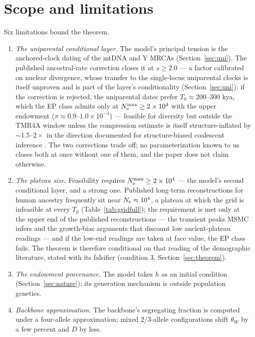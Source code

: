 \section{Scope and limitations}\label{sec:limits}
Six limitations bound the theorem.
\begin{enumerate}
\item \emph{The uniparental conditional layer.} The model's principal
tension is the anchored-clock dating of the mtDNA and Y MRCAs
(Section~\ref{sec:uni}). The published ancestral-rate correction
\citep{Scally2012} closes it at $s \ge 2.0$ --- a factor calibrated on
nuclear divergence, whose transfer to the single-locus uniparental clocks
is itself unproven and is part of the layer's conditionality
(Section~\ref{sec:uni}); if the correction is
rejected, the uniparental dates prefer $T_0 \approx 200$--$300$ kya,
which the EP class admits only at $N_{\mathrm{e}}^{\max} \ge 2\times10^{4}$ with the
upper endowment ($\pi \approx 0.9$--$1.0\times10^{-3}$) --- feasible for
diversity but outside the TMR4A window unless the compression estimate is
itself structure-inflated by $\sim$1.5--$2\times$ in the direction
documented for structure-biased coalescent inference
\citep{ErikssonManica2012,Scerri2019}. The two corrections trade off; no
parameterization known to us closes both at once without one of them,
and the paper does not claim otherwise.
\item \emph{The plateau size.} Feasibility requires
$N_{\mathrm{e}}^{\max} \ge 2\times10^{4}$ --- the model's second conditional layer,
and a strong one. Published long-term reconstructions for human ancestry
frequently sit near $N_{\mathrm{e}} \approx 10^{4}$, a plateau at which the grid is
infeasible at every $T_0$ (Table~\ref{tab:gridfull}); the requirement is
met only at the upper end of the published reconstructions --- the
transient peaks MSMC infers \citep{LiDurbin2011,SchiffelsDurbin2014} and
the growth-bias arguments that discount low ancient-plateau readings ---
and if the low-end readings are taken at face value, the EP class fails.
The theorem is therefore conditional on that reading of the demographic
literature, stated with its falsifier (condition 3,
Section~\ref{sec:theorem}).
\item \emph{The endowment provenance.} The model takes $h$ as an initial
condition (Section~\ref{sec:nature}); its generation mechanism is outside
population genetics.
\item \emph{Backbone approximation.} The backbone's segregating fraction
is computed under a four-allele approximation; mixed 2/3-allele
configurations shift $\theta_W$ by a few percent and $D$ by less.

\end{enumerate}
